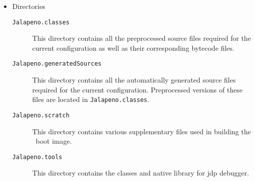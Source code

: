 \begin{itemize}
\item Directories
   \begin{description}
   \item [{\tt Jalapeno.classes}] This directory contains all
   the preprocessed source files required for the current
   configuration as well as their corresponding bytecode files.

   \item [{\tt Jalapeno.generatedSources}] This directory contains
   all the automatically generated source files required for the current
   configuration.  Preprocessed versions of these files are located
   in {\tt Jalapeno.classes}.

   \item [{\tt Jalapeno.scratch}] This directory contains various
   supplementary files used in building the \jp\ boot image.

   \item [{\tt Jalapeno.tools}] This directory contains the classes
   and native library for jdp debugger.


\end{description}
\end{itemize}
